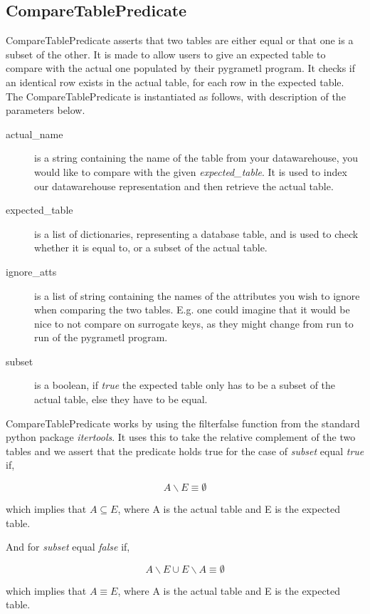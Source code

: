 \subsection{CompareTablePredicate}
CompareTablePredicate asserts that two tables are either equal or that one is a subset of the other. It is made to allow users to give an expected table to compare with the actual one populated by their pygrametl program. It checks if an identical row exists in the actual table, for each row in the expected table. The CompareTablePredicate is instantiated as follows, with description of the parameters below.


\begin{description}
\item [actual\_name] is a string containing the name of the table from your datawarehouse, you would like to compare with the given \textit{expected\_table}. It is used to index our datawarehouse representation and then retrieve the actual table.
\item [expected\_table] is a list of dictionaries, representing a database table, and is used to check whether it is equal to, or a subset of the actual table.
\item [ignore\_atts] is a list of string containing the names of the attributes you wish to ignore when comparing the two tables. E.g. one could imagine that it would be nice to not compare on surrogate keys, as they might change from run to run of the pygrametl program.
  \item [subset] is a boolean, if \textit{true} the expected table only has to be a subset of the actual table, else they have to be equal.
\end{description}

CompareTablePredicate works by using the filterfalse function from the standard python package \textit{itertools}. It uses this to take the relative complement of the two tables and we assert that the predicate holds true for the case of \textit{subset} equal \textit{true} if,

\[ A \backslash E \equiv \emptyset \]

\noindent which implies that $A \subseteq E$, where A is the actual table and E is the expected table.

And for \textit{subset} equal \textit{false} if,

\[ A \backslash E \cup E \backslash A \equiv \emptyset \]

\noindent which implies that $A \equiv E$, where A is the actual table and E is the expected table.
